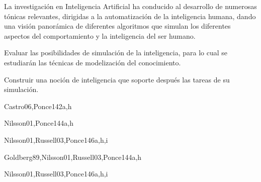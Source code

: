 \begin{syllabus}


\begin{justification}
La investigación en Inteligencia Artificial ha conducido al desarrollo de
numerosas tónicas relevantes, dirigidas a la automatización de la
inteligencia humana, dando una visión panorámica de diferentes
algoritmos que simulan los diferentes aspectos del comportamiento
y la inteligencia del ser humano.
\end{justification}

\begin{goals}
\item Evaluar las posibilidades de simulación de la inteligencia, para lo cual se estudiarán las técnicas de modelización del conocimiento.
\item Construir una noción de inteligencia que soporte después las tareas de su simulación.
\end{goals}

\begin{outcomes}
\end{outcomes}

\begin{unit}{\ISFundamentalIssuesDef}{}{Castro06,Ponce14}{2}{a,h}
    \ISFundamentalIssuesAllTopics
    \ISFundamentalIssuesAllObjectives
\end{unit}

\begin{unit}{\ISBasicSearchStrategiesDef}{}{Nilsson01,Ponce14}{4}{a,h}
    \ISBasicSearchStrategiesAllTopics
    \ISBasicSearchStrategiesAllObjectives
\end{unit}

\begin{unit}{\ISKnowledgementBasedReasoningDef}{}{Nilsson01,Russell03,Ponce14}{6}{a,h,i}
    \ISKnowledgementBasedReasoningAllTopics
    \ISKnowledgementBasedReasoningAllObjectives
\end{unit}

\begin{unit}{\ISAdvancedSearchDef}{}{Goldberg89,Nilsson01,Russell03,Ponce14}{4}{a,h}
     \ISAdvancedSearchAllTopics
     \ISAdvancedSearchAllObjectives
\end{unit}

\begin{unit}{\ISAdvancedReasoningDef}{}{Nilsson01,Russell03,Ponce14}{6}{a,h,i}
    \ISAdvancedReasoningAllTopics
    \ISAdvancedReasoningAllObjectives
\end{unit}


\end{syllabus}
